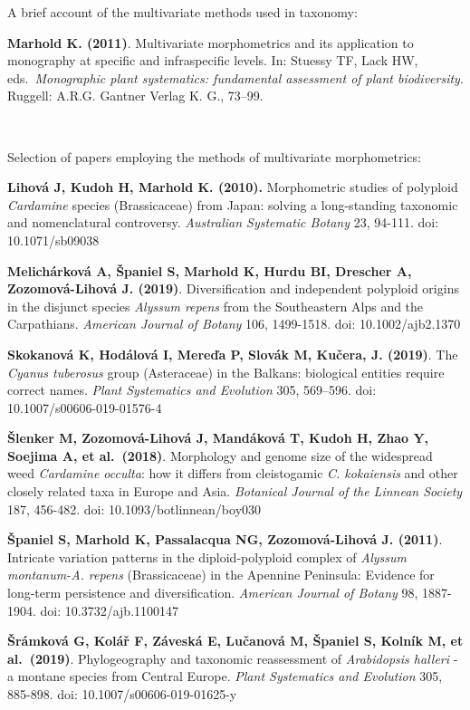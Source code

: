 \documentclass[
]{article}
\begin{document}
A brief account of the multivariate methods used in taxonomy:

\textbf{Marhold K. (2011)}. Multivariate morphometrics and its
application to monography at specific and infraspecific levels. In:
Stuessy TF, Lack HW, eds.~\emph{Monographic plant systematics:
fundamental assessment of plant biodiversity}. Ruggell: A.R.G. Gantner
Verlag K. G., 73--99.

~

Selection of papers employing the methods of multivariate morphometrics:

\textbf{Lihová J, Kudoh H, Marhold K. (2010).} Morphometric studies of
polyploid \emph{Cardamine} species (Brassicaceae) from Japan: solving a
long-standing taxonomic and nomenclatural controversy. \emph{Australian
Systematic Botany} 23, 94-111. doi: 10.1071/sb09038

\textbf{Melichárková A, Španiel S, Marhold K, Hurdu BI, Drescher A,
Zozomová-Lihová J. (2019)}. Diversification and independent polyploid
origins in the disjunct species \emph{Alyssum repens} from the
Southeastern Alps and the Carpathians. \emph{American Journal of Botany}
106, 1499-1518. doi: 10.1002/ajb2.1370

\textbf{Skokanová K, Hodálová I, Mereďa P, Slovák M, Kučera, J. (2019)}.
The \emph{Cyanus tuberosus} group (Asteraceae) in the Balkans:
biological entities require correct names. \emph{Plant Systematics and
Evolution} 305, 569--596. doi: 10.1007/s00606-019-01576-4

\textbf{Šlenker M, Zozomová-Lihová J, Mandáková T, Kudoh H, Zhao Y,
Soejima A, et al.~(2018)}. Morphology and genome size of the widespread
weed \emph{Cardamine occulta}: how it differs from cleistogamic \emph{C.
kokaiensis} and other closely related taxa in Europe and Asia.
\emph{Botanical Journal of the Linnean Society} 187, 456-482. doi:
10.1093/botlinnean/boy030

\textbf{Španiel S, Marhold K, Passalacqua NG, Zozomová-Lihová J.
(2011)}. Intricate variation patterns in the diploid-polyploid complex
of \emph{Alyssum montanum-A. repens} (Brassicaceae) in the Apennine
Peninsula: Evidence for long-term persistence and diversification.
\emph{American Journal of Botany} 98, 1887-1904. doi:
10.3732/ajb.1100147

\textbf{Šrámková G, Kolář F, Záveská E, Lučanová M, Španiel S, Kolník M,
et al.~(2019)}. Phylogeography and taxonomic reassessment of
\emph{Arabidopsis halleri} - a montane species from Central Europe.
\emph{Plant Systematics and Evolution} 305, 885-898. doi:
10.1007/s00606-019-01625-y
\end{document}
